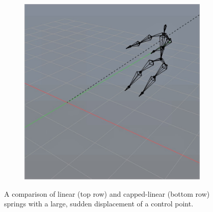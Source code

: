 \documentclass[10pt,twocolumn,letterpaper]{article}
\begin{document}
\begin{figure}[]
\begin{subfigure}{0.2\textwidth}
        \centering
        \includegraphics[width=.9\linewidth]{capped-cannon-1000.jpg}
    \end{subfigure}

    \caption{A comparison of linear (top row) and capped-linear (bottom row) springs with a large, sudden displacement of a control point.}
    \label{img:cannon}
\end{figure}
\end{document}
